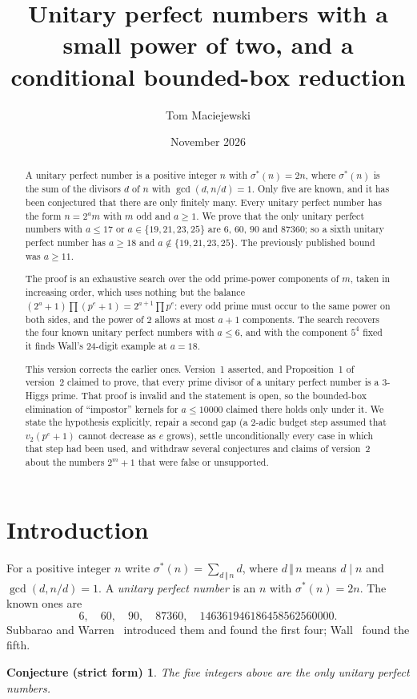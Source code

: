 \documentclass[11pt]{amsart}
\title[Unitary perfect numbers with a small power of two]{Unitary perfect numbers with a small power of two, and a conditional bounded-box reduction}
\author[T. Maciejewski]{Tom Maciejewski}
\date{November 2026}
\theoremstyle{plain}
\newtheorem*{conjecture-fwd}{Conjecture (strict form)}
\theoremstyle{definition}
\newcommand{\RESULTabstract}{the only unitary perfect numbers with $a\le 17$ or $a\in\{19, 21, 23, 25\}$ are $6$, $60$, $90$ and $87360$; so a sixth unitary perfect number has $a\ge 18$ and $a\notin\{19, 21, 23, 25\}$.}
\newcommand{\RESULTwallabstract}{The search recovers the four known unitary perfect numbers with $a\le 6$, and with the component $5^4$ fixed it finds Wall's $24$-digit example at $a=18$.}
\begin{document}
\begin{abstract}
A unitary perfect number is a positive integer $n$ with $\sigma^*(n)=2n$,
where $\sigma^*(n)$ is the sum of the divisors $d$ of $n$ with
$\gcd(d,n/d)=1$.  Only five are known, and it has been conjectured that there
are only finitely many.  Every unitary perfect number has the form $n=2^am$ with $m$ odd
and $a\ge1$.  We prove that \RESULTabstract{}  The previously published bound
was $a\ge 11$.

The proof is an exhaustive search over the odd prime-power components of
$m$, taken in increasing order, which uses nothing but the balance
$(2^a+1)\prod(p^e+1)=2^{a+1}\prod p^e$: every odd prime must occur to the same
power on both sides, and the power of $2$ allows at most $a+1$ components.
\RESULTwallabstract{}

This version corrects the earlier ones.  Version~1 asserted, and
Proposition~1 of version~2 claimed to prove, that every prime divisor of a
unitary perfect number is a 3-Higgs prime.  That proof is invalid and the
statement is open, so the bounded-box elimination of ``impostor'' kernels for
$a\le 10000$ claimed there holds only under it.  We state the hypothesis
explicitly, repair a second gap (a 2-adic budget step assumed that
$v_2(p^e+1)$ cannot decrease as $e$ grows), settle unconditionally every case
in which that step had been used, and withdraw several conjectures and claims
of version~2 about the numbers $2^m+1$ that were false or unsupported.
\end{abstract}

\maketitle

\section{Introduction}

For a positive integer $n$ write $\sigma^*(n)=\sum_{d\,\Vert\,n}d$, where
$d\,\Vert\,n$ means $d\mid n$ and $\gcd(d,n/d)=1$.  A \emph{unitary perfect
number} is an $n$ with $\sigma^*(n)=2n$.  The known ones are
\[
6,\quad 60,\quad 90,\quad 87360,\quad 146361946186458562560000 .
\]
Subbarao and Warren~\cite{SW1966} introduced them and found the first four;
Wall~\cite{Wall1975} found the fifth.

\begin{conjecture-fwd}
The five integers above are the only unitary perfect numbers.
\end{conjecture-fwd}
\end{document}
